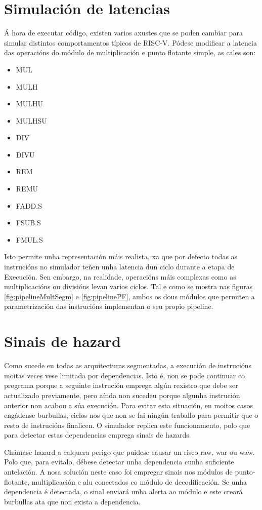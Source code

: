 \section{Simulación de latencias}\label{sec:sim_latencias}
Á hora de executar código, existen varios axustes que se poden cambiar para simular distintos comportamentos típicos de RISC-V. Pódese modificar a latencia  das operacións do módulo de multiplicación e punto flotante simple, as cales son: 
\begin{itemize}
    \item MUL
    \item MULH
    \item MULHU
    \item MULHSU
    \item DIV
    \item DIVU
    \item REM
    \item REMU
    \item FADD.S
    \item FSUB.S
    \item FMUL.S
\end{itemize}

Isto permite unha representación máis realista, xa que por defecto todas as instrucións no simulador teñen unha latencia dun ciclo durante a etapa de Execución. Sen embargo, na realidade, operacións máis complexas como as multiplicacións ou divisións levan varios ciclos. Tal e como se mostra nas figuras \ref{fig:pipelineMultSegm} e \ref{fig:pipelinePF}, ambos os dous módulos que permiten a parametrización das instrucións implementan o seu propio pipeline.

\section{Sinais de hazard}\label{sec:hazards}
Como sucede en todas as \gls{arquitecturas} segmentadas, a execución de instrucións moitas veces vese limitada por dependencias. Isto é, non se pode continuar co programa porque a seguinte instrución emprega algún rexistro que debe ser actualizado previamente, pero aínda non sucedeu porque algunha instrución anterior non acabou a súa execución. Para evitar esta situación, en moitos casos engádense burbullas, ciclos nos que non se fai ningún traballo para permitir que o resto de instrucións finalicen. O simulador replica este funcionamento, polo que para detectar estas dependencias emprega sinais de \gls{hazards}.

Chámase hazard a calquera perigo que puidese causar un risco \acrfull{raw}, \acrfull{war} ou \acrfull{waw}. Polo que, para evitalo, débese detectar unha dependencia cunha suficiente antelación. A nosa solución neste caso foi empregar sinais nos módulos de punto-flotante, multiplicación e \acrshort{alu} conectados co módulo de decodificación. Se unha dependencia é detectada, o sinal enviará unha alerta ao módulo e este creará burbullas ata que non exista a dependencia.